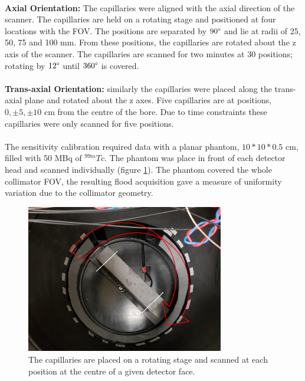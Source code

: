 \paragraph{}
\textbf{Axial Orientation:} The capillaries were aligned with the axial direction of the scanner. The capillaries are held on a rotating stage and positioned at four locations with the \acrshort{FOV}. The positions are separated by $90\degree$ and lie at radii of 25, 50, 75 and 100 mm. From these positions, the capillaries are rotated about the z axis of the scanner. The capillaries are scanned for two minutes at 30 positions; rotating by $12\degree$ until $360\degree$ is covered. 
\paragraph{}
\textbf{Trans-axial Orientation:} similarly the capillaries were placed along the trans-axial plane and rotated about the z axes. Five capillaries are at positions, $ 0, \pm 5, \pm 10 $ cm from the centre of the bore. Due to time constraints these capillaries were only scanned for five positions.
\paragraph{}
The sensitivity calibration required data with a planar phantom, $10 * 10 * 0.5$ cm, filled with 50 MBq of $^{99m}Tc$. The phantom was place in front of each detector head and scanned individually (figure \ref{fig:georCal}). The phantom covered the whole collimator \acrshort{FOV}, the resulting flood acquisition gave a measure of uniformity variation due to the collimator geometry. 

\begin{figure}[!t]
\centering
\includegraphics[width=3.4in]{figures/geoCal.png}
\caption{The capillaries are placed on a rotating stage and scanned at each position at the centre of a given detector face.}
\label{fig:georCal}
\end{figure}


